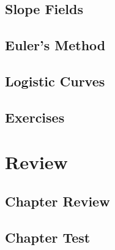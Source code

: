 \subsection{Slope Fields}
\subsection{Euler's Method}
\subsection{Logistic Curves}
\newpage
\subsection{Exercises}


\newpage
\section{Review}
\subsection{Chapter Review}
\subsection{Chapter Test}
